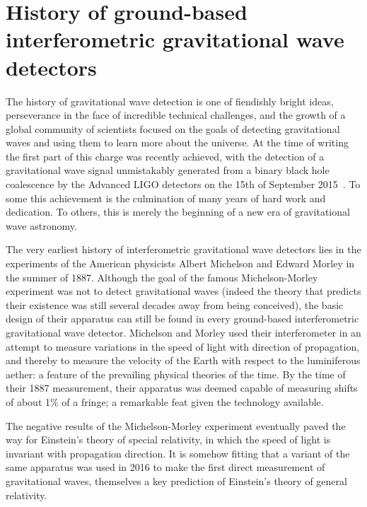 \section{History of ground-based interferometric gravitational wave detectors}\label{subsec:prehistory}

The history of gravitational wave detection is one of fiendishly bright ideas, perseverance in the face of incredible 
technical challenges, and the growth of a global community of scientists focused on the goals of detecting 
gravitational waves and using them to learn more about the universe. At the time of writing the first part of this 
charge was recently achieved, with the detection of a gravitational wave signal unmistakably generated from a binary 
black hole coalescence by the Advanced LIGO detectors on the 15th of September 2015~\cite{GW150914}. To 
some this achievement is the culmination of many years of hard work and dedication. To others, this is merely 
the beginning of a new era of gravitational wave astronomy. 

The very earliest history of interferometric gravitational wave detectors lies in the experiments 
of the American physicists Albert Michelson and Edward Morley in the summer of 1887. Although 
the goal of the famous Michelson-Morley experiment was not to detect gravitational waves (indeed 
the theory that predicts their existence was still several decades away from being conceived), the basic 
design of their apparatus can still be found in every ground-based interferometric gravitational wave detector. 
Michelson and Morley used their interferometer in an attempt to measure variations in the speed of 
light with direction of propagation, and thereby to measure the velocity of the Earth with respect to the 
luminiferous aether: a feature of the prevailing physical theories of the time. By the time of their 1887 measurement, 
their apparatus was deemed capable of measuring shifts of about 1\% of a fringe; a remarkable feat given the 
technology available. 

The negative results of the Michelson-Morley experiment eventually paved the way for Einstein's theory of special 
relativity, in which the speed of light is invariant with propagation direction. It is somehow fitting that a variant 
of the same apparatus was used in 2016 to make the first direct measurement of gravitational waves, themselves 
a key prediction of Einstein's theory of general relativity. 

